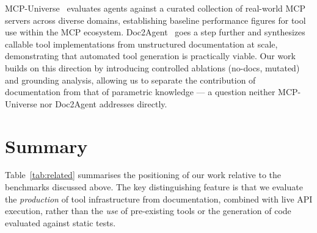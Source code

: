 \documentclass[12pt]{report}
\begin{document}
MCP-Universe~\cite{mcpuniverse2025} evaluates agents against a curated
collection of real-world MCP servers across diverse domains, establishing
baseline performance figures for tool use within the MCP ecosystem.
Doc2Agent~\cite{doc2agent2025} goes a step further and synthesizes
callable tool implementations from unstructured documentation at scale,
demonstrating that automated tool generation is practically viable. Our work builds on this direction by
introducing controlled ablations (no-docs, mutated) and grounding analysis,
allowing us to separate the contribution of documentation from that of
parametric knowledge --- a question neither MCP-Universe nor Doc2Agent
addresses directly.

\section{Summary}

Table~\ref{tab:related} summarises the positioning of our work relative to
the benchmarks discussed above. The key distinguishing feature is that we
evaluate the \emph{production} of tool infrastructure from documentation,
combined with live API execution, rather than the \emph{use} of pre-existing
tools or the generation of code evaluated against static tests.
\end{document}
